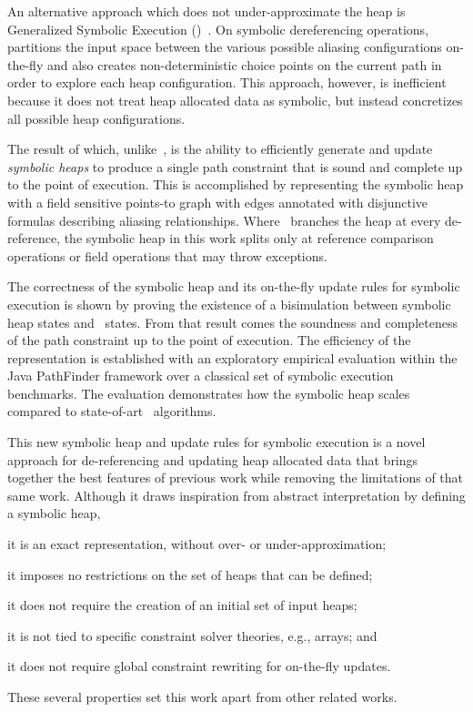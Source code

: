 An alternative approach which does not under-approximate the heap is
Generalized Symbolic Execution
(\gsetxt{})~\cite{Cadar:2008,KiasanKunit,GSE03,Rosner:2015}.  On symbolic
dereferencing operations,~\gsetxt{} partitions the input space between the
various possible aliasing configurations on-the-fly and also creates
non-deterministic choice points on the current path in order to
explore each heap configuration. This approach, however, is
inefficient because it does not treat heap allocated data as symbolic,
but instead concretizes all possible heap configurations.

 The
result of which, unlike~\gsetxt{}, is the ability to efficiently generate
and update \emph{symbolic heaps} to produce a single path constraint
that is sound and complete up to the point of execution. This is
accomplished by representing the symbolic heap with a field sensitive
points-to graph with edges annotated with disjunctive formulas
describing aliasing relationships. Where~\gsetxt{} branches the heap at every
de-reference, the symbolic heap in this work splits only at reference
comparison operations or field operations that may throw exceptions.

The correctness of the symbolic heap and its on-the-fly update rules
for symbolic execution is shown by proving the existence of a
bisimulation between symbolic heap states and~\gsetxt{} states. From that
result comes the soundness and completeness of the path constraint up
to the point of execution.  The efficiency of the representation is
established with an exploratory empirical evaluation within the Java
PathFinder framework over a classical set of symbolic execution
benchmarks. The evaluation demonstrates how the symbolic heap scales
compared to state-of-art~\gsetxt{} algorithms.

This new symbolic heap and update rules for symbolic execution is a
novel approach for de-referencing and updating heap allocated data
that brings together the best features of previous work while removing
the limitations of that same work. Although it draws inspiration from
abstract interpretation by defining a symbolic heap,
\begin{compactitem}
  \item it is an exact representation, without over- or under-approximation;
  \item it imposes no restrictions on the set of heaps that can be defined;
  \item it does not require the creation of an initial set of input heaps;
  \item it is not tied to specific constraint solver theories, e.g., arrays; and
  \item it does not require global constraint rewriting for on-the-fly updates.
\end{compactitem}
These several properties set this work apart from other related works.

